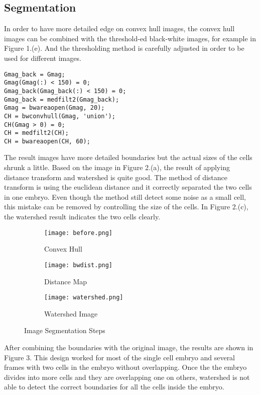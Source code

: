 \documentclass[12pt]{article}
\begin{document}
\subsection{Segmentation}

\qquad In order to have more detailed edge on convex hull images, the convex hull images can be combined with the threshold-ed black-white images, for example in Figure 1.(e). And the thresholding method is carefully adjusted in order to be used for different images. \\

\begin{verbatim}
Gmag_back = Gmag;
Gmag(Gmag(:) < 150) = 0;
Gmag_back(Gmag_back(:) < 150) = 0;
Gmag_back = medfilt2(Gmag_back);
Gmag = bwareaopen(Gmag, 20);
CH = bwconvhull(Gmag, 'union');
CH(Gmag > 0) = 0;
CH = medfilt2(CH);
CH = bwareaopen(CH, 60);
\end{verbatim}

\noindent \qquad The result images have more detailed boundaries but the actual sizes of the cells shrunk a little. Based on the image in Figure 2.(a), the result of applying distance transform and watershed is quite good. The method of distance transform is using the euclidean distance and it correctly separated the two cells in one embryo. Even though the method still detect some noise as a small cell, this mistake can be removed by controlling the size of the cells. In Figure 2.(c), the watershed result indicates the two cells clearly.

\begin{figure}[h!]
	\centering
    \begin{subfigure}[b]{0.25\textwidth}
    	\texttt{[image: before.png]}
        \caption{Convex Hull}
        \label{fig:convhull}
	\end{subfigure}
    \begin{subfigure}[b]{0.25\textwidth}
    	\texttt{[image: bwdist.png]}
        \caption{Distance Map}
        \label{fig:bwdist}
	\end{subfigure}
    \begin{subfigure}[b]{0.25\textwidth}
    	\texttt{[image: watershed.png]}
        \caption{Watershed Image}
        \label{fig:watershed}
	\end{subfigure}
    \caption{Image Segmentation Steps}\label{fig:Progress}
\end{figure}

\noindent \qquad After combining the boundaries with the original image, the results are shown in Figure 3. This design worked for most of the single cell embryo and several frames with two cells in the embryo without overlapping. Once the the embryo divides into more cells and they are overlapping one on others, watershed is not able to detect the correct boundaries for all the cells inside the embryo. \\
\end{document}
